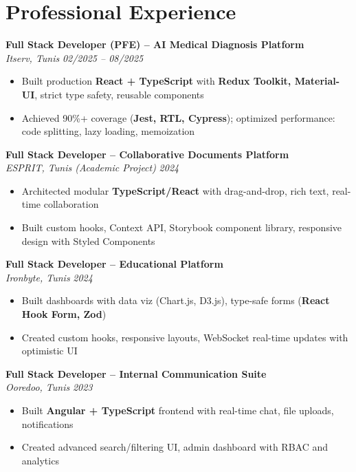 \documentclass[10pt,a4paper]{article}
\begin{document}
\section*{Professional Experience}
{\small

\textbf{Full Stack Developer (PFE) -- AI Medical Diagnosis Platform}\\[1pt]
\textit{Itserv, Tunis} \hfill \textit{02/2025 -- 08/2025}
\begin{itemize}[leftmargin=12pt,itemsep=2pt,topsep=3pt,parsep=0pt]
  \item Built production \textbf{React + TypeScript} with \textbf{Redux Toolkit, Material-UI}, strict type safety, reusable components
  \item Achieved 90\%+ coverage (\textbf{Jest, RTL, Cypress}); optimized performance: code splitting, lazy loading, memoization
\end{itemize}

\vspace{3pt}
\textbf{Full Stack Developer -- Collaborative Documents Platform}\\[1pt]
\textit{ESPRIT, Tunis (Academic Project)} \hfill \textit{2024}
\begin{itemize}[leftmargin=12pt,itemsep=2pt,topsep=3pt,parsep=0pt]
  \item Architected modular \textbf{TypeScript/React} with drag-and-drop, rich text, real-time collaboration
  \item Built custom hooks, Context API, Storybook component library, responsive design with Styled Components
\end{itemize}

\vspace{3pt}
\textbf{Full Stack Developer -- Educational Platform}\\[1pt]
\textit{Ironbyte, Tunis} \hfill \textit{2024}
\begin{itemize}[leftmargin=12pt,itemsep=2pt,topsep=3pt,parsep=0pt]
  \item Built dashboards with data viz (Chart.js, D3.js), type-safe forms (\textbf{React Hook Form, Zod})
  \item Created custom hooks, responsive layouts, WebSocket real-time updates with optimistic UI
\end{itemize}

\vspace{3pt}
\textbf{Full Stack Developer -- Internal Communication Suite}\\[1pt]
\textit{Ooredoo, Tunis} \hfill \textit{2023}
\begin{itemize}[leftmargin=12pt,itemsep=2pt,topsep=3pt,parsep=0pt]
  \item Built \textbf{Angular + TypeScript} frontend with real-time chat, file uploads, notifications
  \item Created advanced search/filtering UI, admin dashboard with RBAC and analytics
\end{itemize}

}
\end{document}
